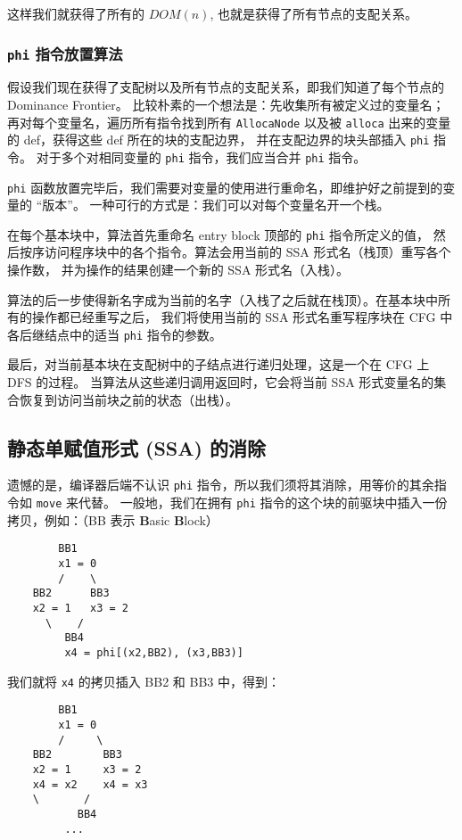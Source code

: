 这样我们就获得了所有的 $DOM(n)$, 也就是获得了所有节点的支配关系。

\subsubsection{\texttt{phi} 指令放置算法}

假设我们现在获得了支配树以及所有节点的支配关系，即我们知道了每个节点的 Dominance Frontier。
比较朴素的一个想法是：先收集所有被定义过的变量名；再对每个变量名，遍历所有指令找到所有 \texttt{AllocaNode}
以及被 \texttt{alloca} 出来的变量的 def，获得这些 def 所在的块的支配边界，
并在支配边界的块头部插入 \texttt{phi} 指令。
对于多个对相同变量的 \texttt{phi} 指令，我们应当合并 \texttt{phi} 指令。

\texttt{phi} 函数放置完毕后，我们需要对变量的使用进行重命名，即维护好之前提到的变量的 “版本”。
一种可行的方式是：我们可以对每个变量名开一个栈。

在每个基本块中，算法首先重命名 entry block 顶部的 \texttt{phi} 指令所定义的值，
然后按序访问程序块中的各个指令。算法会用当前的 SSA 形式名（栈顶）重写各个操作数，
并为操作的结果创建一个新的 SSA 形式名（入栈）。

算法的后一步使得新名字成为当前的名字（入栈了之后就在栈顶）。在基本块中所有的操作都已经重写之后，
我们将使用当前的 SSA 形式名重写程序块在 CFG 中各后继结点中的适当 \texttt{phi} 指令的参数。

最后，对当前基本块在支配树中的子结点进行递归处理，这是一个在 CFG 上 DFS 的过程。
当算法从这些递归调用返回时，它会将当前 SSA 形式变量名的集合恢复到访问当前块之前的状态（出栈）。

\subsection{静态单赋值形式 (SSA) 的消除}

遗憾的是，编译器后端不认识 \texttt{phi} 指令，所以我们须将其消除，用等价的其余指令如 \texttt{move} 来代替。
一般地，我们在拥有 \texttt{phi} 指令的这个块的前驱块中插入一份拷贝，例如：（BB 表示 \textbf{B}asic \textbf{B}lock）
\begin{lstlisting}
        BB1
        x1 = 0
        /    \
    BB2      BB3
    x2 = 1   x3 = 2
      \    /
         BB4
         x4 = phi[(x2,BB2), (x3,BB3)]
\end{lstlisting}

我们就将 \texttt{x4} 的拷贝插入 BB2 和 BB3 中，得到：
\begin{lstlisting}
        BB1
        x1 = 0
        /     \
    BB2        BB3
    x2 = 1     x3 = 2
    x4 = x2    x4 = x3
    \       /
           BB4
         ...
\end{lstlisting}


